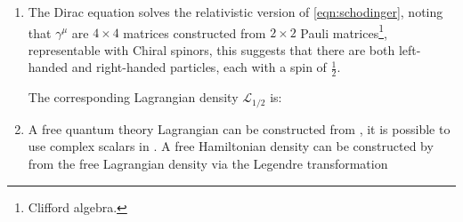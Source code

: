 \begin{enumerate}
        Requiring the squared version of the operator
        $(i \gamma^\mu \partial_\mu - m)$ to recover \cref{eqn:k-g} when
        operating\footnote{
            Note that $i \gamma^\mu \partial_\mu \psi = m \psi$,
            so there will be no cross term.
        } on $\psi$:
        \begin{equation}
            (i \gamma^\mu \partial_\mu - m)
            (i \gamma^\nu \partial_\nu - m) \psi =
            (\gamma^\mu\gamma^\nu \partial_\nu \partial_\mu + m^2) \psi = 0
        \end{equation}
        we find a relation between $\gamma^\mu, \gamma^\nu$:
        \begin{equation}
            \left\{ \gamma^\mu, \gamma^\nu \right\} = 2 \eta^{\mu\nu}
        \end{equation}
        which are $4 \times 4$ matrices constructable from $2 \times 2$ Pauli
        matrices.


        It is then possible to construct a Lagrangian density\footnote{
            Starting from here, to be more concise, ``Lagrangian'' is used
            in place of ``Lagrangian density''.
            Same for ``Hamiltonian'' in place of ``Hamiltonian density''.
        } $\mathcal{L}_\text{free}$
        that leads to the correct dynamical equations
        (i.e. Klein-Gordon and Dirac)
        by the Euler-Lagrange equation\footnote{
            That is:
            $\frac{\partial \mathcal{L}}{\partial \phi} - \partial_\mu (\frac{\partial \mathcal{L}}{\partial (\partial_\mu \phi)}) = 0$.
        }:

        \begin{equation}
            \mathcal{L}_\text{free} =
                \frac{1}{2} \partial_\mu \phi \partial^\mu \phi -
                \frac{1}{2} m \phi^2
        \end{equation}

    \item The Dirac equation solves the relativistic version of
        \cref{eqn:schodinger},
        noting that $\gamma^\mu$ are $4 \times 4$ matrices constructed from
        $2 \times 2$ Pauli matrices\footnote{
            Clifford algebra.
        },
        representable with Chiral spinors,
        this suggests that there are both left-handed and right-handed particles,
        each with a spin of $\frac{1}{2}$.

        The corresponding Lagrangian density $\mathcal{L}_{1/2}$ is:

    \item A free quantum theory Lagrangian can be constructed from ,
        it is possible to use complex scalars in .
        A free Hamiltonian density can be constructed by from the free
        Lagrangian density via the Legendre transformation


\end{enumerate}
